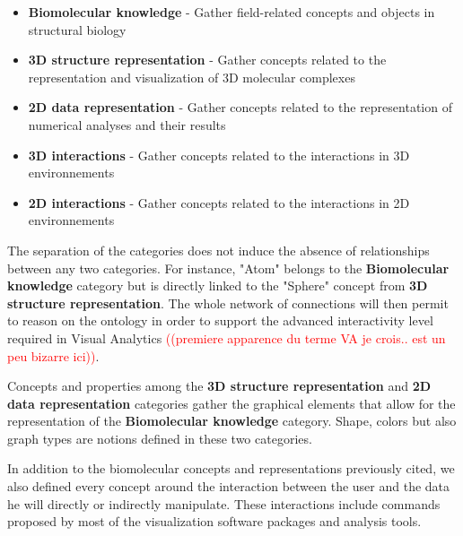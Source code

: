\documentclass{vgtc}                          %
\newcommand*\mvb[1]{\textcolor{red}{#1}}
\begin{document}
\begin{itemize}
  \item \textbf{Biomolecular knowledge} - Gather field-related concepts and objects in structural biology 
  \item \textbf{3D structure representation} - Gather concepts related to the representation and visualization of 3D molecular complexes
  \item \textbf{2D data representation} - Gather concepts related to the representation of numerical analyses and their results
  \item \textbf{3D interactions} - Gather concepts related to the interactions in 3D environnements
  \item \textbf{2D interactions} - Gather concepts related to the interactions in 2D environnements
\end{itemize}

The separation of the categories does not induce the absence of relationships between any two categories. For instance, "Atom" belongs to the \textbf{Biomolecular knowledge} category but is directly linked to the "Sphere" concept from \textbf{3D structure representation}. The whole network of connections will then permit to reason on the ontology in order to support the advanced interactivity level required in Visual Analytics \mvb{((premiere apparence du terme VA je crois.. est un peu bizarre ici))}.

Concepts and properties among the \textbf{3D structure representation} and \textbf{2D data representation} categories gather the graphical elements that allow for the representation of the \textbf{Biomolecular knowledge} category. Shape, colors but also graph types are notions defined in these two categories. 

In addition to the biomolecular concepts and representations previously cited, we also defined every concept around the interaction between the user and the data he will directly or indirectly manipulate. These interactions include commands proposed by most of the visualization software packages and analysis tools.
\end{document}

